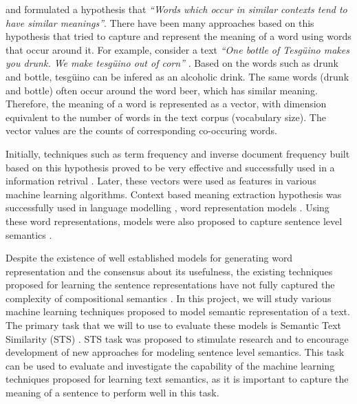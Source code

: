 \documentclass[12pt]{report} %
\begin{document}
	
	 \cite{harris1970distributional} and \cite{firth1957synopsis} formulated a hypothesis that \textit{ \textquotedblleft Words which occur in similar contexts tend to have similar meanings\textquotedblright}. There have been many approaches based on this hypothesis that tried to capture and represent the meaning of a word using words that occur around it. For example, consider a text \textit{ \textquotedblleft One bottle of Tesgüino makes you drunk. We make tesgüino out of corn\textquotedblright} \citep{jurafsky2014speech}.  Based on the words such as drunk and bottle, tesgüino can be infered as an alcoholic drink. The same words (drunk and bottle) often occur around the word beer, which has similar meaning. Therefore, the meaning of a word is represented as a vector, with dimension equivalent to the number of words in the text corpus (vocabulary size). The vector values are the counts of corresponding co-occuring words.
	 
	 Initially, techniques such as term frequency and inverse document frequency built based on this hypothesis proved to be very effective and successfully used in a information retrival \citep{salton1971smart, deerwester1989computer}. 
	 Later, these vectors were used as features in various machine learning algorithms. Context based meaning extraction hypothesis was successfully used in language modelling \citep{bengio2003neural,collobert2008unified,collobert2011natural,mikolov2011extensions}, word representation models \citep{mikolov2014word2vec,pennington2014glove}. Using these word representations, models were also proposed to capture sentence level semantics  \citep{kiros2015skip,conneau2017supervised,shao2017hcti}. 	

	
	
	
	
 
	  
	Despite the existence of well established models for generating word representation and the consensus about its usefulness, the existing techniques proposed for learning the sentence representations have not fully captured the complexity of compositional semantics \citep{conneau2017supervised}. In this project, we will study various machine learning techniques proposed to model semantic representation of a text. The primary task that we will to use to evaluate these models is Semantic Text Similarity (STS) \citep{agirre2012semeval}. STS task was proposed to stimulate research and to encourage development of new approaches for modeling sentence level semantics. %
	This task can be used to evaluate and investigate the capability of the machine learning techniques proposed for learning text semantics, as it is important to capture the meaning of a sentence to perform well in this task.
	
\end{document}
